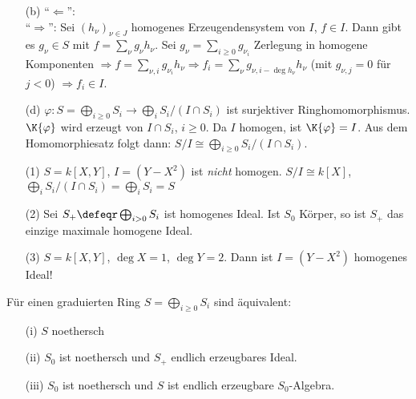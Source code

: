 \begin{Bew}
\begin{enumerate}
\item[(b)] ``$\Leftarrow$'': \chk\\
``$\Rightarrow$'': Sei $(h_{\nu})_{\nu\in J}$ homogenes Erzeugendensystem von $I$,
$f\in I$. Dann gibt es $g_\nu\in S$ mit $f=\sum_{\nu}g_\nu h_\nu$.
Sei $g_\nu=\sum_{i\geq 0}g_{\nu_i}$ Zerlegung in homogene Komponenten
$\Rightarrow f=\sum_{\nu, i} g_{\nu_i}h_\nu
\Rightarrow f_i=\sum_\nu g_{\nu,i-\deg{h_\nu}}h_\nu$ 
(mit $g_{\nu,j}=0$ f\"ur $j< 0$) $\Rightarrow f_i\in I$.

\item[(d)] $\varphi:S=\bigoplus_{i\geq 0}S_i\to \bigoplus_i S_i/(I\cap S_i)$ ist
surjektiver Ringhomomorphismus. $\K{\varphi}$ wird erzeugt von $I\cap S_i$, $i\geq 0$.
Da $I$ homogen, ist $\K{\varphi}=I$. Aus dem Homomorphiesatz folgt dann:
$S/I\cong \bigoplus_{i\geq 0}S_i/(I\cap S_i)$.
\end{enumerate}
\end{Bew}

\begin{nnBsp}
\begin{enumerate}

\item[(1)] $S=k[X,Y]$, $I=(Y-X^2)$ ist \emph{nicht} homogen.
$S/I\cong k[X]$, $\bigoplus_i S_i/(I\cap S_i)=\bigoplus_i S_i=S$

\item[(2)] Sei $S_{+}\defeqr\bigoplus_{i> 0}S_i$ ist homogenes Ideal.
Ist $S_0$ K\"orper, so ist $S_{+}$ das einzige maximale homogene Ideal.

\item[(3)] $S=k[X,Y]$, $\deg{X}=1$, $\deg{Y}=2$. 
Dann ist $I=(Y-X^2)$ homogenes Ideal!

\end{enumerate}
\end{nnBsp}

\begin{DefBem}
\label{2.15}
F\"ur einen graduierten Ring $S=\bigoplus_{i\geq 0} S_i$ sind \"aquivalent:
\begin{enumerate}
\item[(i)] $S$ noethersch
\item[(ii)] $S_0$ ist noethersch und $S_{+}$ endlich erzeugbares Ideal.
\item[(iii)] $S_0$ ist noethersch und $S$ ist endlich erzeugbare $S_0$-Algebra.
\end{enumerate}
\end{DefBem}

